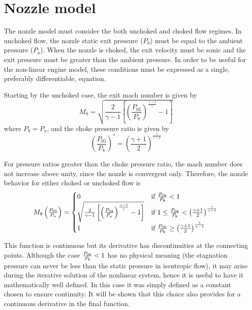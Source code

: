 \documentclass[tcc]{subfiles}
\begin{document}
\section{Nozzle model}
The nozzle model must consider the both unchoked and choked flow regimes. 
In unchoked flow, the nozzle static exit pressure ($P_8$) must be equal to the ambient pressure ($P_a$). 
When the nozzle is choked, the exit velocity must be sonic 
and the exit pressure must be greater than the ambient pressure.
In order to be useful for the non-linear engine model, these conditions must be expressed as a single, preferably differentiable, equation. 

Starting by the unchoked case, the exit mach number is given by
\begin{equation}
    M_8 = \sqrt{\frac{2}{\gamma-1}\left[\left(\frac{P_{05}}{P_8}\right)^{\frac{\gamma-1}{\gamma}}-1\right]}
\end{equation}
where $P_8=P_a$, and the choke pressure ratio is given by
\begin{equation}
    \left(\frac{P_{05}}{P_8}\right)^* = \left(\frac{\gamma+1}{2}\right)^\frac{\gamma}{\gamma-1}
\end{equation}

For pressure ratios greater than the choke pressure ratio, the mach number does not increase above unity, 
since the nozzle is convergent only. Therefore, the nozzle behavior for either choked or unchoked flow is
\begin{equation}
    \label{eqn:M8}
    M_8\left(\tfrac{P_{05}}{P_a}\right) = \begin{cases}
        0 &\text{if $\frac{P_{08}}{P_{8}} < 1$} \\
        \sqrt{\frac{2}{\gamma-1}\left[\left(\frac{P_{08}}{P_a}\right)^{\frac{\gamma-1}{\gamma}}-1\right]} 
        &\text{if $1 \leq \frac{P_{08}}{P_{8}} <\left(\frac{\gamma+1}{2}\right)^\frac{\gamma}{\gamma-1}$} \\
        1 & \text{if $\frac{P_{08}}{P_{8}} \geq \left(\frac{\gamma+1}{2}\right)^\frac{\gamma}{\gamma-1}$ }
    \end{cases}
\end{equation}


This function is continuous but its derivative has discontinuities at the connecting points. 
Although the case $\frac{P_{08}}{P_{8}}<1$ has no physical meaning 
(the stagnation pressure can never be less than the static pressure in isentropic flow), 
it may arise during the iterative solution of the nonlinear system, 
hence it is useful to have it mathematically well defined. 
In this case it was simply defined as a constant chosen to ensure continuity. It will be shown that this choice also provides for a continuous derivative in the final function.
\end{document}
